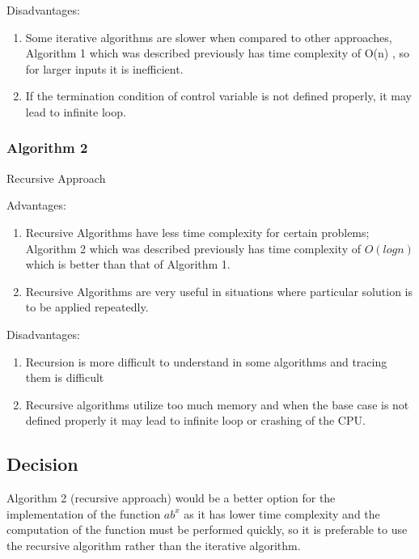 \documentclass[12pt, a4paper]{article}
\begin{document}
Disadvantages:
\begin{enumerate}
    \item {Some iterative algorithms are slower when compared to other approaches, Algorithm 1 which was described previously has time complexity of O(n) , so for larger inputs it is inefficient.}
    \item {If the termination condition of control variable is not defined properly, it may lead to infinite loop.}
    
\end{enumerate}

\subsubsection{Algorithm 2}
Recursive Approach 

Advantages:
\begin{enumerate}
    \item {Recursive Algorithms have less time complexity for certain problems;  Algorithm 2 which was described previously has time complexity of $O(logn)$ which is better than that of Algorithm 1.}
    \item {Recursive Algorithms are very useful in situations where particular solution is to be applied repeatedly.}
    
\end{enumerate}

Disadvantages:
\begin{enumerate}
    \item {Recursion is more difficult to understand in some algorithms and tracing them is difficult}
    \item {Recursive algorithms utilize too much memory and when the base case is not defined properly it may lead to infinite loop or crashing of the CPU.}
    
\end{enumerate}

\subsection*{Decision}
Algorithm 2 (recursive approach) would be a better option for the implementation of the function $ab^x$ as it has lower time complexity and the computation of the function must be performed quickly, so it is preferable to use the recursive algorithm rather than the iterative algorithm.
\end{document}
